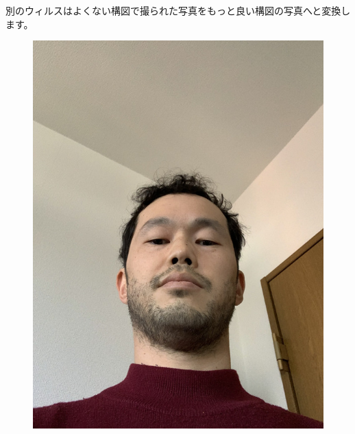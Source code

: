 \documentclass[12pt, unicode]{beamer}
\begin{document}
\begin{frame}

別のウィルスはよくない構図で撮られた写真をもっと良い構図の写真へと変換します。

\begin{figure}[htbp]
  \begin{minipage}[b]{0.4\linewidth}
    \centering
    \includegraphics[keepaspectratio, scale=0.15]{pic3.jpg}
  \end{minipage}
  \begin{minipage}[b]{0.18\linewidth}
  \end{minipage}
  \begin{minipage}[b]{0.4\linewidth}
    \centering

\end{minipage}
\end{figure}
\end{frame}
\end{document}
